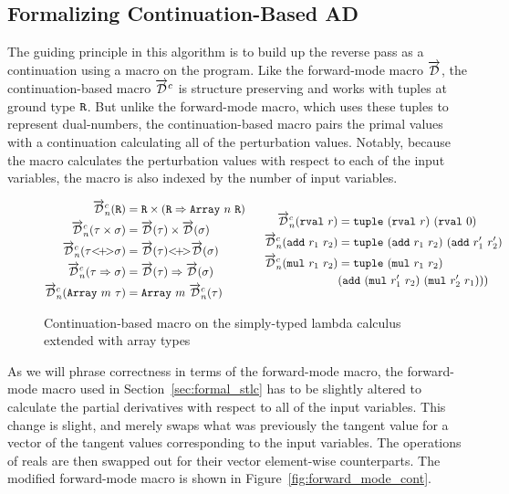 \subsection{Formalizing Continuation-Based AD}\label{sec:continuation_based}
  The guiding principle in this algorithm is to build up the reverse pass as a continuation using a macro on the program.
  Like the forward-mode macro $\overrightarrow{\mathcal{D}}$, the continuation-based macro $\overrightarrow{\mathcal{D}}^c$ is structure preserving and works with tuples at ground type $\texttt{R}$.
  But unlike the forward-mode macro, which uses these tuples to represent dual-numbers, the continuation-based macro pairs the primal values with a continuation calculating all of the perturbation values.
  Notably, because the macro calculates the perturbation values with respect to each of the input variables, the macro is also indexed by the number of input variables.

  \begin{figure}[H]
    \centering
    \begin{equation*}
      \begin{split}
        \overrightarrow{\mathcal{D}}^c_n(\texttt{R}) &= \texttt{R} \times (\texttt{R} \Rightarrow \texttt{Array}\ n\ \texttt{R}) \\
        \overrightarrow{\mathcal{D}}^c_n(\tau \times \sigma) &= \overrightarrow{\mathcal{D}}(\tau) \times \overrightarrow{\mathcal{D}}(\sigma) \\
        \overrightarrow{\mathcal{D}}^c_n(\tau {<}\!{+}\!{>} \sigma) &= \overrightarrow{\mathcal{D}}(\tau) {<}\!{+}\!{>} \overrightarrow{\mathcal{D}}(\sigma) \\
        \overrightarrow{\mathcal{D}}^c_n(\tau \Rightarrow \sigma) &= \overrightarrow{\mathcal{D}}(\tau) \Rightarrow \overrightarrow{\mathcal{D}}(\sigma) \\
        \overrightarrow{\mathcal{D}}^c_n(\texttt{Array}\ m\ \tau) &= \texttt{Array}\ m\ \overrightarrow{\mathcal{D}}^c_n(\tau)
      \end{split}
      \;\;\;\;\;\;
      \begin{split}
        \overrightarrow{\mathcal{D}}^c_n(\texttt{rval}\ r) &= \texttt{tuple}\ (\texttt{rval}\ r)\ (\texttt{rval}\ 0) \\
        \overrightarrow{\mathcal{D}}^c_n(\texttt{add}\ r_1\ r_2) &= \texttt{tuple}\ (\texttt{add}\ r_1\ r_2)\ (\texttt{add}\ r_1'\ r_2') \\
        \overrightarrow{\mathcal{D}}^c_n(\texttt{mul}\ r_1\ r_2) &= \texttt{tuple}\ (\texttt{mul}\ r_1\ r_2)\ \\
          &{(\texttt{add}\ (\texttt{mul}\ r_1'\ r_2)\ (\texttt{mul}\ r_2'\ r_1))})
      \end{split}
    \end{equation*}
    \caption{Continuation-based macro on the simply-typed lambda calculus extended with array types}
    \label{eqn:macro_base}
  \end{figure}

  As we will phrase correctness in terms of the forward-mode macro, the forward-mode macro used in Section~\ref{sec:formal_stlc} has to be slightly altered to calculate the partial derivatives with respect to all of the input variables.
  This change is slight, and merely swaps what was previously the tangent value for a vector of the tangent values corresponding to the input variables.
  The operations of reals are then swapped out for their vector element-wise counterparts.
  The modified forward-mode macro is shown in Figure~\ref{fig:forward_mode_cont}.

